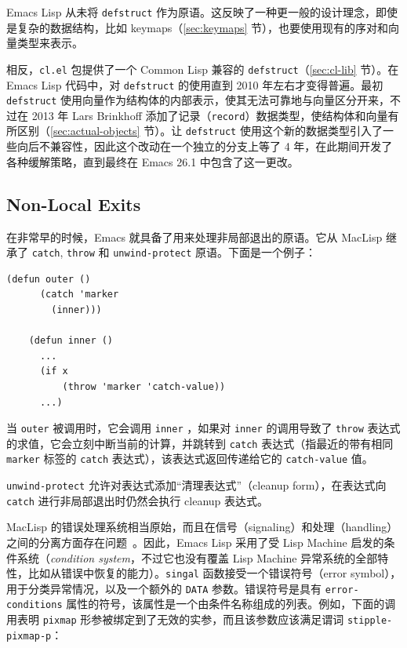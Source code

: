 \documentclass[format=acmsmall,screen]{acmart}
\begin{document}
Emacs Lisp 从未将 \texttt{defstruct} 作为原语。这反映了一种更一般的设计理念，即使是复杂的数据结构，比如 keymaps（\ref{sec:keymaps} 节），也要使用现有的序对和向量类型来表示。

相反，\texttt{cl.el} 包提供了一个 Common Lisp 兼容的 \texttt{defstruct}（\ref{sec:cl-lib} 节）。在 Emacs Lisp 代码中，对 \texttt{defstruct} 的使用直到 2010 年左右才变得普遍。最初 \texttt{defstruct} 使用向量作为结构体的内部表示，使其无法可靠地与向量区分开来，不过在 2013 年 Lars Brinkhoff 添加了记录（\texttt{record}）数据类型，使结构体和向量有所区别（\ref{sec:actual-objects} 节）。让 \texttt{defstruct} 使用这个新的数据类型引入了一些向后不兼容性，因此这个改动在一个独立的分支上等了 4 年，在此期间开发了各种缓解策略，直到最终在 Emacs 26.1 中包含了这一更改。

\subsection{Non-Local Exits}
\label{sec:non-local-exits}

在非常早的时候，Emacs 就具备了用来处理非局部退出的原语。它从 MacLisp 继承了 \texttt{catch}, \texttt{throw} 和 \texttt{unwind-protect} 原语。下面是一个例子：
%
\begin{Verbatim}[samepage=true]
    (defun outer ()
      (catch 'marker
        (inner)))

    (defun inner ()
      ...
      (if x
          (throw 'marker 'catch-value))
      ...)
\end{Verbatim}
%
当 \texttt{outer} 被调用时，它会调用 \texttt{inner} ，如果对 \texttt{inner} 的调用导致了 \texttt{throw} 表达式的求值，它会立刻中断当前的计算，并跳转到 \texttt{catch} 表达式（指最近的带有相同 \texttt{marker} 标签的 \texttt{catch} 表达式），该表达式返回传递给它的 \texttt{catch-value} 值。

\texttt{unwind-protect} 允许对表达式添加“清理表达式”（cleanup form），在表达式向 \texttt{catch} 进行非局部退出时仍然会执行 cleanup 表达式。

MacLisp 的错误处理系统相当原始，而且在信号（signaling）和处理（handling）之间的分离方面存在问题~\cite{Pitman2001}。因此，Emacs Lisp 采用了受 Lisp Machine 启发的条件系统（\emph{condition system}，不过它也没有覆盖 Lisp Machine 异常系统的全部特性，比如从错误中恢复的能力）。\texttt{singal} 函数接受一个错误符号（error symbol），用于分类异常情况，以及一个额外的 \texttt{DATA} 参数。错误符号是具有 \texttt{error-conditions} 属性的符号，该属性是一个由条件名称组成的列表。例如，下面的调用表明 \texttt{pixmap} 形参被绑定到了无效的实参，而且该参数应该满足谓词 \texttt{stipple-pixmap-p}：
\end{document}
